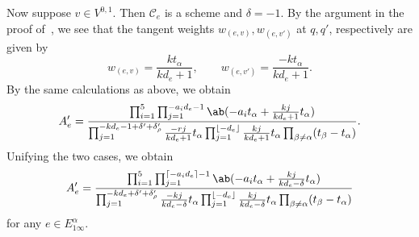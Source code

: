 \documentclass{amsart}
\DeclarePairedDelimiter{\floor}{\lfloor}{\rfloor}
\DeclarePairedDelimiter{\ceil}{\lceil}{\rceil}
\theoremstyle{definition}
\theoremstyle{remark}
\theoremstyle{plain}
\theoremstyle{definition}
\theoremstyle{remark}
\newcommand{\mc}[1]{\mathcal{#1}}
\newcommand{\1}{\mathbf{1}}
\newcommand{\2}{\mathbf{2}}
\newcommand{\3}{\mathbf{3}}
\begin{document}
Now suppose $v \in V^{0,1}$. Then $\mc{C}_e$ is a scheme and $\delta = -1$. By the argument in the proof of~\cite[Lemma 4.1]{msp2}, we see that the tangent weights $w_{(e,v)}, w_{(e,v')}$ at $q, q'$, respectively are given by
\[ w_{(e,v)} = \frac{k t_{\alpha}}{k d_e+1}, \qquad w_{(e,v')} = \frac{-k t_{\alpha}}{k d_e + 1}. \]
By the same calculations as above, we obtain
\[ A'_e = \frac{\prod_{i=1}^5 \prod_{j=1}^{-a_i d_e-1} \ab(-a_i t_{\alpha} + \frac{kj}{kd_e+1}t_{\alpha})}{\prod_{j=1}^{-k d_e -1 + \delta' + \delta'_{\rho}} \frac{-r j}{k d_e+1} t_{\alpha} \prod_{j=1}^{\floor{-d_e}} \frac{kj}{kd_e+1}t_{\alpha} \prod_{\beta \neq \alpha} (t_{\beta}-t_{\alpha})}. \]
Unifying the two cases, we obtain
\[ A'_e = \frac{\prod_{i=1}^5 \prod_{j=1}^{\ceil{-a_i d_e}-1} \ab(-a_i t_{\alpha} + \frac{kj}{kd_e - \delta}t_{\alpha})}{\prod_{j=1}^{-k d_e + \delta' + \delta'_{\rho}} \frac{-kj}{kd_e-\delta} t_{\alpha} \prod_{j=1}^{\floor{-d_e}} \frac{kj}{kd_e - \delta}t_{\alpha} \prod_{\beta \neq \alpha} (t_{\beta}-t_{\alpha})} \]
for any $e \in E_{1\infty}^{\alpha}$.
\end{document}
